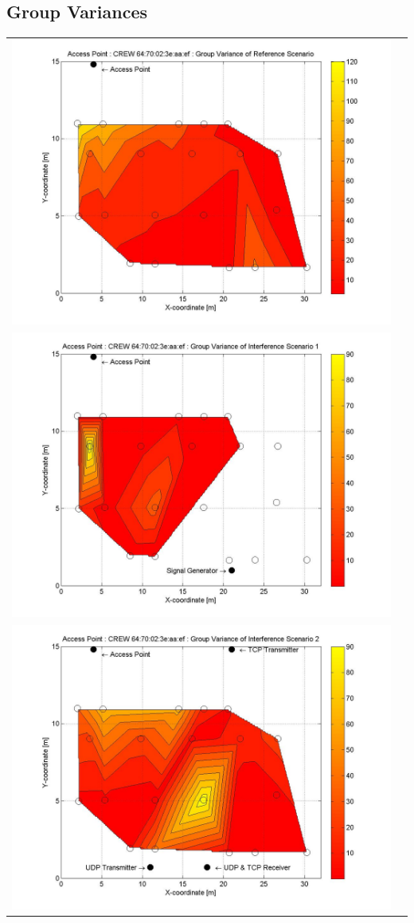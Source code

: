 \documentclass[11pt,a4paper,headinclude,footinclude,chapterprefix=on]{scrreprt}
\begin{document}
\subsection{Group Variances} 
\begin{longtable}
	{lr} 
	\includegraphics[width=13cm]{../../Source/plot/CREW_ef/ef_Ref_Group_Variance.jpg} \\
	\includegraphics[width=13cm]{../../Source/plot/CREW_ef/ef_Sig_Group_Variance.jpg} \\
	\includegraphics[width=13cm]{../../Source/plot/CREW_ef/ef_Wifi_Group_Variance.jpg} \\

\end{longtable}
\end{document}
